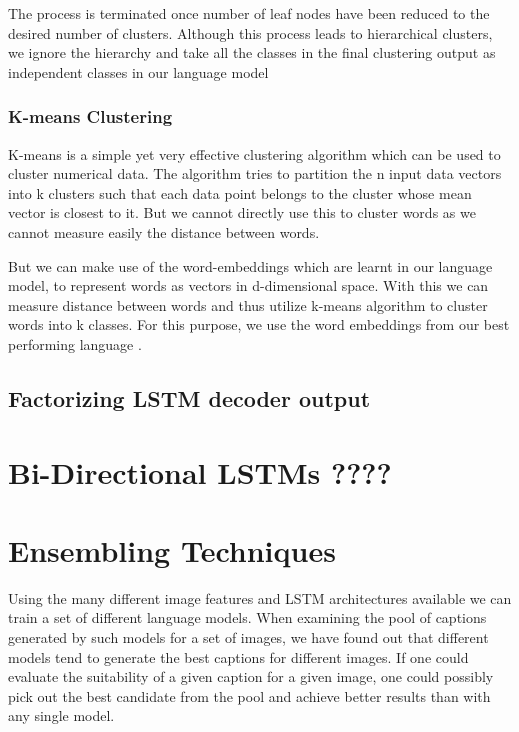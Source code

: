 The process is terminated once number of leaf nodes have been reduced to the
desired number of clusters. 
Although this process leads to hierarchical clusters, we ignore the hierarchy
and take all the classes in the final clustering output as independent classes
in our language model 
\subsubsection{K-means Clustering}

K-means is a simple yet very effective clustering algorithm which can be used to
cluster numerical data.
The algorithm tries to partition the n input data vectors into k clusters such
that each data point belongs to the cluster whose mean vector is closest to it.
But we cannot directly use this to cluster words as we cannot measure easily the
distance between words.

But we can make use of the word-embeddings which are learnt in our language
model, to represent words as vectors in d-dimensional space.
With this we can measure distance between words and thus utilize k-means
algorithm to cluster words into k classes.
For this purpose, we use the word embeddings from our best performing language
.

\subsection{Factorizing LSTM decoder output}

\section{Bi-Directional LSTMs ????}
\section{Ensembling Techniques}
Using the many different image features and LSTM architectures available we can
train a set of different language models.
When examining the pool of captions generated by such models for a set of
images, we have found out that different models tend to generate the best
captions for different images.
If one could evaluate the suitability of a given caption for a given image, one
could possibly pick out the best candidate from the pool and achieve better
results than with any single model.

